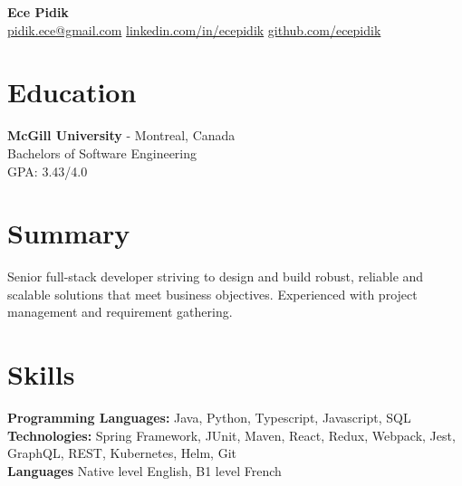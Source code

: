\documentclass[a4paper,10pt]{article}
\begin{document}
\begin{center}
    {\fontsize{18}{18}\textbf{Ece Pidik}\selectfont} \\
    \vspace{0.3em}
    \href{mailto:pidik.ece@gmail.com}{pidik.ece@gmail.com} \textbullet{} 
    \href{https://www.linkedin.com/in/ecepidik}{linkedin.com/in/ecepidik} \textbullet{} 
    \href{github.com/ecepidik}{github.com/ecepidik}
\end{center}

\vspace{-0.4cm}
\noindent
\begin{minipage}[t]{0.38\textwidth}
    \section*{Education}
    \noindent
    \textbf {\large McGill University} - Montreal, Canada \\
    Bachelors of Software Engineering\\
    GPA: 3.43/4.0
\end{minipage}%
\hfill
\begin{minipage}[t]{0.58\textwidth}
    \section*{Summary}
    \noindent
    Senior full-stack developer striving to design and build robust, reliable and scalable solutions that meet business objectives. Experienced with project management and requirement gathering.
\end{minipage}

\vspace{-0.2cm}
\section*{Skills}
\noindent
\textbf{Programming Languages:} Java, Python, Typescript, Javascript, SQL \\
\textbf{Technologies:} Spring Framework, JUnit, Maven, React, Redux, Webpack, Jest, GraphQL, REST, Kubernetes, Helm, Git \\
\textbf{Languages}
Native level English,
B1 level French

\vspace{-0.2cm}
\end{document}
